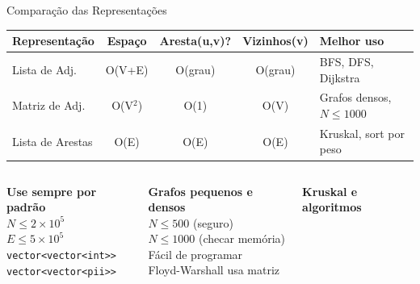 \documentclass[aspectratio=169,10pt]{beamer}
\begin{document}
\begin{frame}{Comparação das Representações}
  \begin{tcolorbox}[caixaAzul,title={Tabela Comparativa}]
    \centering\footnotesize
    \begin{tabular}{lcccl}
      \toprule
      \textbf{Representação} & \textbf{Espaço} & \textbf{Aresta(u,v)?} &
      \textbf{Vizinhos(v)} & \textbf{Melhor uso}\\
      \midrule
      Lista de Adj.    & O(V+E)   & O(grau)  & O(grau)  & BFS, DFS, Dijkstra\\
      Matriz de Adj.   & O(V$^2$) & O(1)     & O(V)     & Grafos densos, $N \le 1000$\\
      Lista de Arestas & O(E)     & O(E)     & O(E)     & Kruskal, sort por peso\\
      \bottomrule
    \end{tabular}
  \end{tcolorbox}
  \vspace{0.12cm}
  \begin{columns}[t]
      \begin{tcolorbox}[caixaGrafo,title={Lista de Adjacência}]
        \footnotesize
        \textbf{Use sempre por padrão}\\[3pt]
        $N \le 2 \times 10^5$\\
        $E \le 5 \times 10^5$\\[3pt]
        \texttt{vector<vector<int>>}\\
        \texttt{vector<vector<pii>>}
      \end{tcolorbox}
      \begin{tcolorbox}[caixaAzul,title={Matriz de Adjacência}]
        \footnotesize
        \textbf{Grafos pequenos e densos}\\[3pt]
        $N \le 500$ (seguro)\\
        $N \le 1000$ (checar memória)\\[3pt]
        Fácil de programar\\
        Floyd-Warshall usa matriz
      \end{tcolorbox}
      \begin{tcolorbox}[caixaLaranja,title={Lista de Arestas}]
        \footnotesize
        \textbf{Kruskal e algoritmos}\\

\end{tcolorbox}
\end{columns}
\end{frame}
\end{document}
